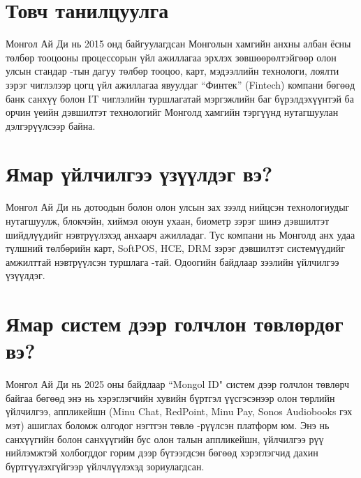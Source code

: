 \section{Товч танилцуулга}
	\quad \quad	Монгол Ай Ди нь 2015 онд байгуулагдсан Монголын хамгийн анхны албан ёсны төлбөр тооцооны процессорын үйл ажиллагаа эрхлэх зөвшөөрөлтэйгөөр олон улсын стандар -тын дагуу төлбөр тооцоо, карт, мэдээллийн технологи, лоялти зэрэг чиглэлээр цогц үйл ажиллагаа явуулдаг “Финтек” (Fintech) компани бөгөөд банк санхүү болон IT чиглэлийн туршлагатай мэргэжлийн баг бүрэлдэхүүнтэй ба орчин үеийн дэвшилтэт технологийг Монголд хамгийн тэргүүнд нутагшуулан дэлгэрүүлсээр байна.

\section{Ямар үйлчилгээ үзүүлдэг вэ?}
	\quad \quad	Монгол Ай Ди нь дотоодын болон олон улсын зах зээлд нийцсэн технологиудыг нутагшуулж, блокчэйн, хиймэл оюун ухаан, биометр зэрэг шинэ дэвшилтэт шийдлүүдийг нэвтрүүлэхэд анхаарч ажилладаг. Тус компани нь Монголд анх удаа түлшний төлбөрийн карт, SoftPOS, HCE, DRM зэрэг дэвшилтэт системүүдийг амжилттай нэвтрүүлсэн туршлага -тай. Одоогийн байдлаар зээлийн үйлчилгээ үзүүлдэг.
     

\section{Ямар систем дээр голчлон төвлөрдөг вэ? }
	\quad \quad	Монгол Ай Ди нь 2025 оны байдлаар “Mongol ID" систем дээр голчлон төвлөрч байгаа бөгөөд энэ нь хэрэглэгчийн хувийн бүртгэл үүсгэсэнээр олон төрлийн үйлчилгээ, аппликейшн (Minu Chat, RedPoint, Minu Pay, Sonos Audiobooks гэх мэт) ашиглах боломж олгодог нэгтгэн төвлө -рүүлсэн платформ юм. Энэ нь санхүүгийн болон санхүүгийн бус олон талын аппликейшн, үйлчилгээ рүү нийлэмжтэй холбогддог горим дээр бүтээгдсэн бөгөөд хэрэглэгчид дахин бүртгүүлэхгүйгээр үйлчлүүлэхэд зориулагдсан.
